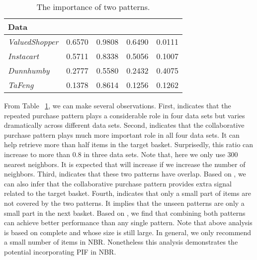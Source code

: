 \documentclass[sigconf]{acmart}
\begin{document}
\begin{table}[ht]
\small
\centering
\caption{The importance of two patterns.}
\begin{tabular}{lcccc}
\toprule
\textbf{Data}& &&&\\
\midrule

\emph{ValuedShopper}&0.6570& 0.9808&0.6490&0.0111 \\

\emph{Instacart}&0.5711 &0.8338& 0.5056&0.1007\\

\emph{Dunnhumby} &0.2777 &0.5580&0.2432&0.4075\\

\emph{TaFeng} &0.1378&0.8614 &0.1256 & 0.1262\\

\bottomrule
\end{tabular}
\label{tab:jaccard}
\end{table}

From Table  ~\ref{tab:jaccard}, we can make several observations. First,  indicates that the repeated purchase pattern plays a considerable role in four data sets but varies dramatically across different data sets. Second,  indicates that the collaborative purchase pattern plays much more  important role in all four data sets. It can help retrieve more than half items in the target basket. Surprisedly, this ratio can increase to more than 0.8 in three data sets. Note that, here we only use 300 nearest neighbors. It is expected that   will increase if we increase the number of neighbors. Third,  indicates that these two patterns have overlap. Based on , we can also infer that the collaborative purchase pattern provides extra signal related to the target basket. Fourth,  indicates that only a small part of items are not covered by the two patterns. It implies that the  unseen patterns are  only a small part in the next basket.  Based on , we find  that combining both patterns can achieve  better performance than any single pattern. Note that above analysis is based on complete  and  whose size is still large. In general, we only recommend a small number of items in NBR. Nonetheless this analysis demonstrates the  potential incorporating  PIF in NBR. 
\end{document}
